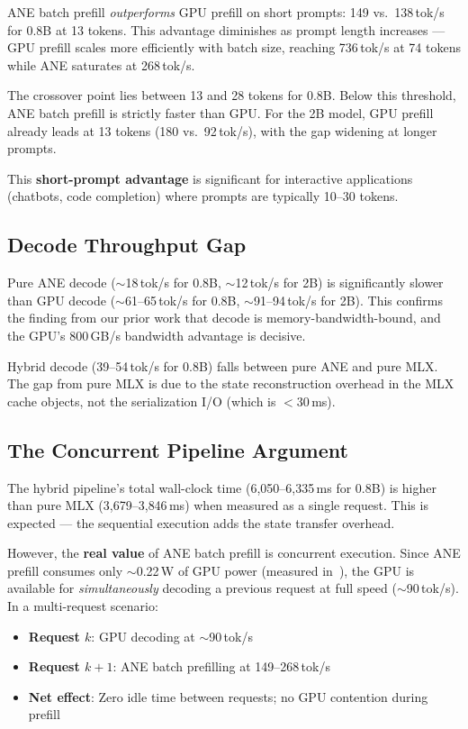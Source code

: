 \documentclass[11pt]{article}
\begin{document}
ANE batch prefill \emph{outperforms} GPU prefill on short prompts: 149
vs.\ 138\,tok/s for 0.8B at 13 tokens. This advantage diminishes as
prompt length increases --- GPU prefill scales more efficiently with batch
size, reaching 736\,tok/s at 74 tokens while ANE saturates at 268\,tok/s.

The crossover point lies between 13 and 28 tokens for 0.8B. Below this
threshold, ANE batch prefill is strictly faster than GPU. For the 2B model,
GPU prefill already leads at 13 tokens (180 vs.\ 92\,tok/s), with the gap
widening at longer prompts.

This \textbf{short-prompt advantage} is significant for interactive
applications (chatbots, code completion) where prompts are typically
10--30 tokens.

\subsection{Decode Throughput Gap}

Pure ANE decode ($\sim$18\,tok/s for 0.8B, $\sim$12\,tok/s for 2B) is
significantly slower than GPU decode ($\sim$61--65\,tok/s for 0.8B,
$\sim$91--94\,tok/s for 2B). This confirms the finding from our prior
work that decode is memory-bandwidth-bound, and the GPU's 800\,GB/s
bandwidth advantage is decisive.

Hybrid decode (39--54\,tok/s for 0.8B) falls between pure ANE and pure
MLX. The gap from pure MLX is due to the state reconstruction overhead
in the MLX cache objects, not the serialization I/O (which is $<$30\,ms).

\subsection{The Concurrent Pipeline Argument}

The hybrid pipeline's total wall-clock time (6{,}050--6{,}335\,ms for
0.8B) is higher than pure MLX (3{,}679--3{,}846\,ms) when measured as a
single request. This is expected --- the sequential execution adds the
state transfer overhead.

However, the \textbf{real value} of ANE batch prefill is concurrent
execution. Since ANE prefill consumes only $\sim$0.22\,W of GPU power
(measured in~\cite{atomgradient2026hybrid}), the GPU is available for
\emph{simultaneously} decoding a previous request at full speed
($\sim$90\,tok/s). In a multi-request scenario:

\begin{itemize}[nosep]
  \item \textbf{Request $k$}: GPU decoding at $\sim$90\,tok/s
  \item \textbf{Request $k+1$}: ANE batch prefilling at 149--268\,tok/s
  \item \textbf{Net effect}: Zero idle time between requests; no GPU
        contention during prefill
\end{itemize}
\end{document}
